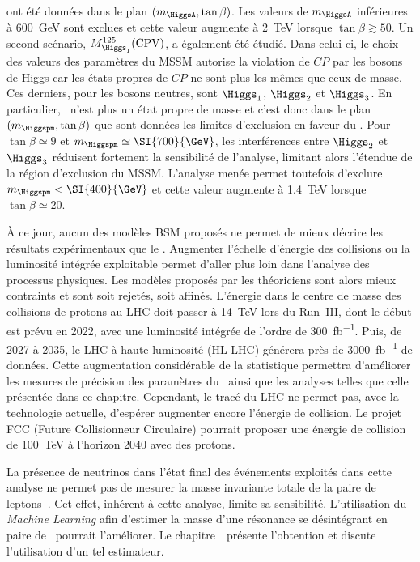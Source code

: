 ont été données
dans le plan
$(m_{\HiggsA},\tan\beta)$.
Les valeurs de $m_{\HiggsA}$ inférieures à \SI{600}{\GeV} sont exclues
et cette valeur augmente à \SI{2}{\TeV} lorsque $\tan\beta\gtrsim\num{50}$.
Un second scénario, $M_{\Higgs_1}^{125}(\text{CPV})$,
a également été étudié.
Dans celui-ci, le choix des valeurs des paramètres du MSSM
autorise la violation de $CP$ par les bosons de Higgs
car les états propres de $CP$ ne sont plus les mêmes que ceux de masse.
Ces derniers, pour les bosons neutres, sont
$\Higgs_1$, $\Higgs_2$ et $\Higgs_3$.
En particulier, \HiggsA\ n'est plus un état propre de masse et c'est donc
dans le plan $(m_{\Higgspm},\tan\beta)$ que sont données les limites d'exclusion en faveur du \SM.
Pour $\tan\beta\simeq\num{9}$ et $m_{\Higgspm}\simeq\SI{700}{\GeV}$,
les interférences entre $\Higgs_2$ et $\Higgs_3$ réduisent fortement la sensibilité de l'analyse,
limitant alors l'étendue de la région d'exclusion du MSSM.
L'analyse menée permet toutefois d'exclure $m_{\Higgspm} < \SI{400}{\GeV}$
et cette valeur augmente à \SI{1.4}{\TeV} lorsque $\tan\beta\simeq\num{20}$.
\par
À ce jour,
aucun des modèles BSM proposés ne permet de mieux décrire les résultats expérimentaux que le \SM.
Augmenter l'échelle d'énergie des collisions ou la luminosité intégrée exploitable permet d'aller plus loin dans l'analyse des processus physiques.
Les modèles proposés par les théoriciens sont alors mieux contraints et sont soit rejetés, soit affinés.
L'énergie dans le centre de masse des collisions de protons au LHC doit passer à \SI{14}{\TeV} lors du Run~III, dont le début est prévu en 2022, avec une luminosité intégrée de l'ordre de \SI{300}{\femto\barn^{-1}}.
Puis, de 2027 à 2035, le LHC à haute luminosité (HL-LHC) générera près de \SI{3000}{\femto\barn^{-1}} de données.
Cette augmentation considérable de la statistique
permettra d'améliorer les mesures de précision des paramètres du \SM\
ainsi que les analyses telles que celle présentée dans ce chapitre.
Cependant, le tracé du LHC ne permet pas, avec la technologie actuelle, d'espérer augmenter encore l'énergie de collision.
Le projet FCC (Future Collisionneur Circulaire) pourrait proposer une énergie de collision de \SI{100}{\TeV} à l'horizon 2040 avec des protons.
\par
La présence de neutrinos dans l'état final des événements exploités dans cette analyse
ne permet pas de mesurer la masse invariante totale de la paire de leptons~\tau.
Cet effet, inhérent à cette analyse, limite sa sensibilité.
L'utilisation du \emph{Machine Learning} afin d'estimer la masse d'une résonance se désintégrant en paire de \tau\ pourrait l'améliorer.
Le chapitre~\refChML\ présente l'obtention et discute l'utilisation d'un tel estimateur.